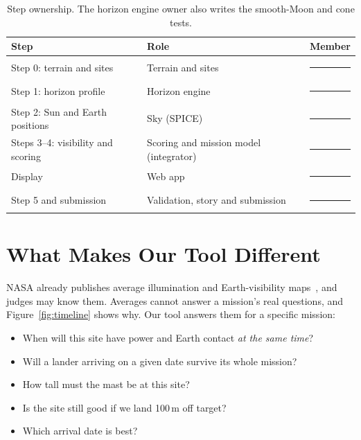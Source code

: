 \documentclass[11pt,a4paper]{article}
\begin{document}
\begin{table}[H]
\centering
\renewcommand{\arraystretch}{1.35}
\begin{tabularx}{\textwidth}{l Y l}
\toprule
\textbf{Step} & \textbf{Role} & \textbf{Member} \\
\midrule
Step 0: terrain and sites & Terrain and sites & \rule{3cm}{0.4pt} \\
Step 1: horizon profile & Horizon engine & \rule{3cm}{0.4pt} \\
Step 2: Sun and Earth positions & Sky (SPICE) & \rule{3cm}{0.4pt} \\
Steps 3--4: visibility and scoring & Scoring and mission model (integrator) & \rule{3cm}{0.4pt} \\
Display & Web app & \rule{3cm}{0.4pt} \\
Step 5 and submission & Validation, story and submission & \rule{3cm}{0.4pt} \\
\bottomrule
\end{tabularx}
\caption{Step ownership. The horizon engine owner also writes the smooth-Moon and cone tests.}
\end{table}

\section{What Makes Our Tool Different}

NASA already publishes average illumination and Earth-visibility maps~\cite{pgda}, and judges may know them. Averages cannot answer a mission's real questions, and Figure~\ref{fig:timeline} shows why. Our tool answers them for a specific mission:
\begin{itemize}
  \item When will this site have power and Earth contact \emph{at the same time}?
  \item Will a lander arriving on a given date survive its whole mission?
  \item How tall must the mast be at this site?
  \item Is the site still good if we land 100\,m off target?
  \item Which arrival date is best?
\end{itemize}
\end{document}
